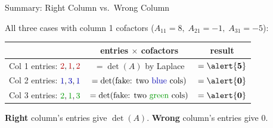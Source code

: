 \documentclass[10pt]{beamer}
\theoremstyle{definition}
\newcommand{\x}[1]{\alert{\textbf{#1}}}
\newcommand{\rd}[1]{{\color{red!70!black}#1}}
\newcommand{\bl}[1]{{\color{blue!70!black}#1}}
\newcommand{\gn}[1]{{\color{green!60!black}#1}}
\begin{document}
\begin{frame}{Summary: Right Column vs.\ Wrong Column}

All three cases with column 1 cofactors ($A_{11}{=}8,\; A_{21}{=}{-}1,\; A_{31}{=}{-}5$):

\vfill

\begin{center}
\renewcommand{\arraystretch}{1.8}
\begin{tabular}{l|c|c}
 & entries $\times$ cofactors & result \\ \hline
\rd{Col 1} entries: $\rd{2}, \rd{1}, \rd{2}$ & $= \det(A)$ by Laplace & $= \x{5}$ \\
\bl{Col 2} entries: $\bl{1}, \bl{3}, \bl{1}$ & $= \det(\text{fake: two \bl{blue} cols})$ & $= \x{0}$ \\
\gn{Col 3} entries: $\gn{2}, \gn{1}, \gn{3}$ & $= \det(\text{fake: two \gn{green} cols})$ & $= \x{0}$
\end{tabular}
\end{center}

\vfill

\x{Right} column's entries give $\det(A)$. \quad \x{Wrong} column's entries give $0$.

\vfill

\begin{center}
\end{center}

\end{frame}
\end{document}
